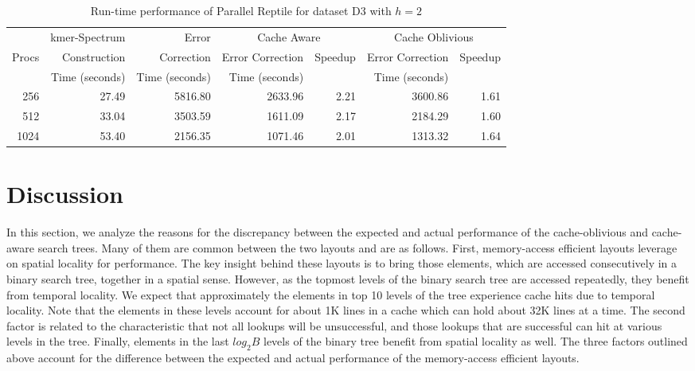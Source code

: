 \documentclass[10pt, conference]{IEEEtran}
\begin{document}
\begin{table*}[ht]
\normalsize
\renewcommand{\arraystretch}{1.3}
\caption{Run-time performance of Parallel Reptile for dataset D3 with $h=2$}
\label{d3h2results}
\centering
\begin{tabular}{r|r|r|rr|rr}
\hline
        & kmer-Spectrum      & Error          & \multicolumn{2}{c|}{Cache Aware} & \multicolumn{2}{c}{Cache Oblivious}  \\
\cline{4-7}
Procs   & Construction    & Correction     & Error Correction & Speedup & Error Correction & Speedup \\
        & Time (seconds)  & Time (seconds) & Time (seconds)   &         & Time (seconds)   &         \\
\hline
256  & 27.49 & 5816.80 & 2633.96 & 2.21 & 3600.86 & 1.61 \\
512  & 33.04 & 3503.59 & 1611.09 & 2.17 & 2184.29 & 1.60 \\
1024 & 53.40 & 2156.35 & 1071.46 & 2.01 & 1313.32 & 1.64 \\
\hline
\end{tabular}
\end{table*}


\section{Discussion} \label{sec_Discussion}
In this section, we analyze the reasons for the discrepancy between the expected and actual performance of the cache-oblivious and cache-aware search trees. Many of them are common between the two layouts and are as follows. First, memory-access efficient layouts leverage on spatial locality for performance. The key insight behind these layouts is to bring those elements, which are accessed consecutively in a binary search tree, together in a spatial sense. However, as the topmost levels of the binary search tree are accessed repeatedly, they benefit from temporal locality. We expect that approximately the elements in top 10 levels of the tree experience cache hits due to temporal locality. Note that the elements in these levels account for about 1K lines in a cache which can hold about 32K lines at a time. The second factor is related to the characteristic that not all lookups will be unsuccessful, and those lookups that are successful can hit at various levels in the tree. Finally, elements in the last $log_2B$ levels of the binary tree benefit from spatial locality as well. The three factors outlined above account for the difference between the expected and actual performance of the memory-access efficient layouts.
\end{document}
